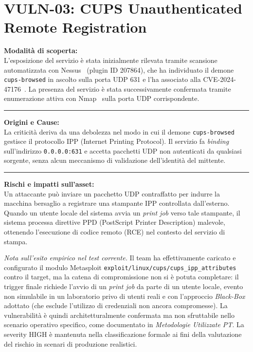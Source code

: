 \documentclass[11pt]{report}
\begin{document}
	\section{VULN-03: CUPS Unauthenticated Remote Registration}
	\begin{tcolorbox}[colback=gray!5, colframe=headerblue, arc=3pt, boxrule=0.8pt, breakable]
		\textbf{Modalità di scoperta:}\\
		L'esposizione del servizio è stata inizialmente rilevata tramite scansione automatizzata con Nessus~\cite{nessus-docs} (plugin ID 207864), che ha individuato il demone \texttt{cups-browsed} in ascolto sulla porta UDP 631 e l'ha associato alla CVE-2024-47176~\cite{cve-cups}. La presenza del servizio è stata successivamente confermata tramite enumerazione attiva con Nmap~\cite{nmap-docs} sulla porta UDP corrispondente.
		
		\vspace{0.2cm}\hrule\vspace{0.2cm}
		
		\textbf{Origini e Cause:}\\
		La criticità deriva da una debolezza nel modo in cui il demone \texttt{cups-browsed} gestisce il protocollo IPP (Internet Printing Protocol). Il servizio fa \textit{binding} sull'indirizzo \texttt{0.0.0.0:631} e accetta pacchetti UDP non autenticati da qualsiasi sorgente, senza alcun meccanismo di validazione dell'identità del mittente.
		
		\vspace{0.2cm}\hrule\vspace{0.2cm}
		
		\textbf{Rischi e impatti sull'asset:}\\
		Un attaccante può inviare un pacchetto UDP contraffatto per indurre la macchina bersaglio a registrare una stampante IPP controllata dall'esterno. Quando un utente locale del sistema avvia un \textit{print job} verso tale stampante, il sistema processa direttive PPD (PostScript Printer Description) malevole, ottenendo l'esecuzione di codice remoto (RCE) nel contesto del servizio di stampa.
		
		\textit{Nota sull'esito empirico nel test corrente.} Il team ha effettivamente caricato e configurato il modulo Metasploit \texttt{exploit/linux/cups/cups\_ipp\_attributes} contro il target, ma la catena di compromissione non si è potuta completare: il trigger finale richiede l'avvio di un \textit{print job} da parte di un utente locale, evento non simulabile in un laboratorio privo di utenti reali e con l'approccio \textit{Black-Box} adottato (che esclude l'utilizzo di credenziali non ancora compromesse). La vulnerabilità è quindi architetturalmente confermata ma non sfruttabile nello scenario operativo specifico, come documentato in \textit{Metodologie Utilizzate PT}. La severity HIGH è mantenuta nella classificazione formale ai fini della valutazione del rischio in scenari di produzione realistici.
		

\end{tcolorbox}
\end{document}
